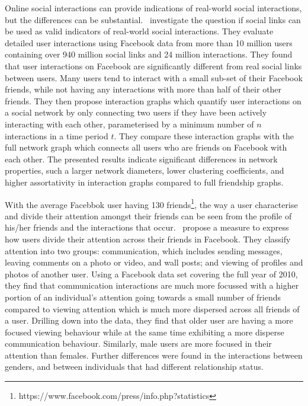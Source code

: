 \documentclass[letterpaper]{article}
\begin{document}
Online social interactions can provide indications of real-world social interactions, but the differences can be substantial.~\cite{wilson2009user} investigate the question if social links can be used as valid indicators of real-world social interactions. They evaluate detailed user interactions using Facebook data from more than 10 million users containing over 940 million social links and 24 million interactions. They found that user interactions on Facebook are significantly different from real social links between users. Many users tend to interact with a small sub-set of their Facebook friends, while not having any interactions with more than half of their other friends. They then propose interaction graphs which quantify user interactions on a social network by only connecting two users if they have been actively interacting with each other, parameterised by a minimum number of $n$ interactions in a time period $t$. They compare these interaction graphs with the full network graph which connects all users who are friends on Facebook with each other. The presented results indicate significant differences in network properties, such a larger network diameters, lower clustering coefficients, and higher assortativity in interaction graphs compared to full friendship graphs.


With the average Facebbok user having 130 friends\footnote{https://www.facebook.com/press/info.php?statistics}, the way a user characterise and divide their attention amongst their friends can be seen from the profile of his/her friends and the interactions that occur.~\cite{backstrom2011center} propose a measure to express how users divide their attention across their friends in Facebook. They classify attention into two groups: communication, which includes sending messages, leaving comments on a photo or video, and wall posts; and viewing of profiles and photos of another user. Using a Facebook data set covering the full year of 2010, they find that communication interactions are much more focussed with a higher portion of an individual's attention going towards a small number of friends compared to viewing attention which is much more dispersed across all friends of a user. Drilling down into the data, they find that older user are having a more focused viewing behaviour while at the same time exhibiting a more disperse communication behaviour. Similarly, male users are more focused in their attention than females. Further differences were found in the interactions between genders, and between individuals that had different relationship status.
\end{document}

